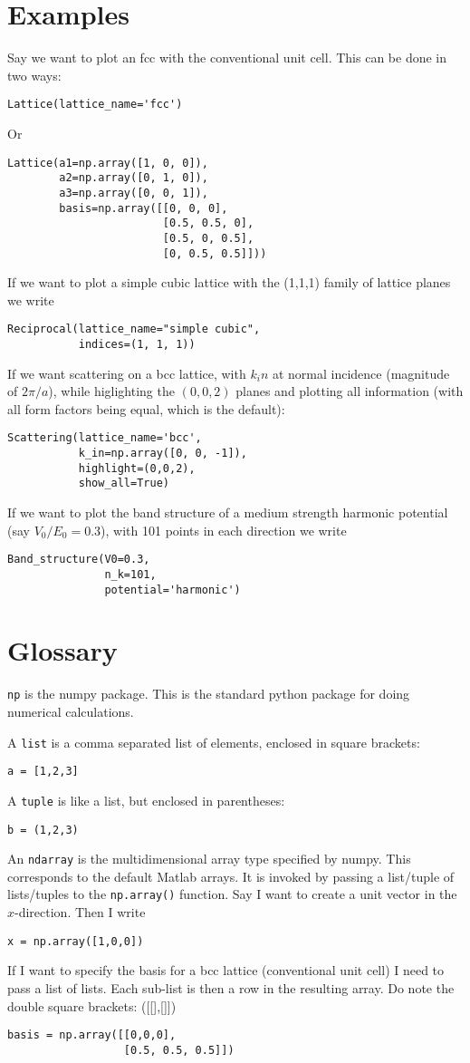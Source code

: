 \documentclass[a4paper,11pt]{article}
\numberwithin{equation}{section}
\begin{document}
\section{Examples}
Say we want to plot an fcc with the conventional unit cell. This can be done in two ways:
\begin{lstlisting}
Lattice(lattice_name='fcc')
\end{lstlisting}
Or
\begin{lstlisting}
Lattice(a1=np.array([1, 0, 0]),
		a2=np.array([0, 1, 0]),
		a3=np.array([0, 0, 1]),
		basis=np.array([[0, 0, 0],
						[0.5, 0.5, 0],
						[0.5, 0, 0.5],
						[0, 0.5, 0.5]]))
\end{lstlisting}
If we want to plot a simple cubic lattice with the (1,1,1) family of lattice planes we write
\begin{lstlisting}
Reciprocal(lattice_name="simple cubic",
		   indices=(1, 1, 1))
\end{lstlisting}
If we want scattering on a bcc lattice, with $ k_in $ at normal incidence (magnitude of $ 2\pi/a $), while higlighting the $ (0,0,2) $ planes and plotting all information (with all form factors being equal, which is the default):
\begin{lstlisting}
Scattering(lattice_name='bcc',
		   k_in=np.array([0, 0, -1]),
		   highlight=(0,0,2),
		   show_all=True)
\end{lstlisting}
If we want to plot the band structure of a medium strength harmonic potential (say $ V_0/E_0 = 0.3$), with 101 points in each direction we write
\begin{lstlisting}
Band_structure(V0=0.3,
			   n_k=101,
			   potential='harmonic')
\end{lstlisting}


\section{Glossary}
\texttt{np} is the numpy package. This is the standard python package for doing numerical calculations.

A \texttt{list} is a comma separated list of elements, enclosed in square brackets:
\begin{lstlisting}
a = [1,2,3]
\end{lstlisting}
A \texttt{tuple} is like a list, but enclosed in parentheses:
\begin{lstlisting}
b = (1,2,3)
\end{lstlisting}
An \texttt{ndarray} is the multidimensional array type specified by numpy. This corresponds to the default Matlab arrays. It is invoked by passing a list/tuple of lists/tuples to the \texttt{np.array()} function. Say I want to create a unit vector in the $ x $-direction. Then I write
\begin{lstlisting}
x = np.array([1,0,0])
\end{lstlisting}
If I want to specify the basis for a bcc lattice (conventional unit cell) I need to pass a list of lists. Each sub-list is then a row in the resulting array. Do note the double square brackets: ([[],[]])
\begin{lstlisting}
basis = np.array([[0,0,0],
				  [0.5, 0.5, 0.5]])
\end{lstlisting}
\end{document}
